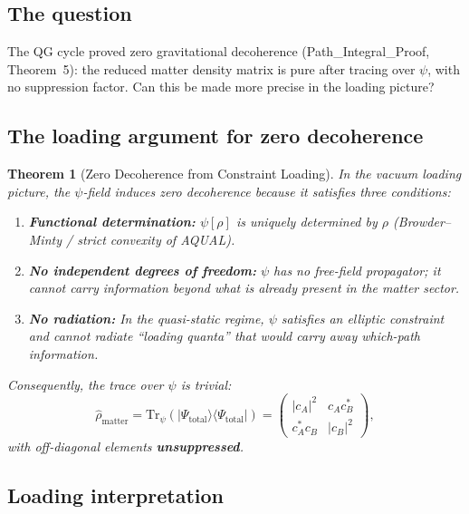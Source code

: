 \documentclass[11pt,a4paper]{article}
\newtheorem{theorem}{Theorem}[section]
\begin{document}
\subsection{The question}

The QG cycle proved zero gravitational decoherence
(Path\_Integral\_Proof, Theorem~5): the reduced matter density matrix is
pure after tracing over $\psi$, with no suppression factor.  Can this be
made more precise in the loading picture?

\subsection{The loading argument for zero decoherence}

\begin{theorem}[Zero Decoherence from Constraint Loading]
\label{thm:zero-decoherence-loading}
In the vacuum loading picture, the $\psi$-field induces zero decoherence
because it satisfies three conditions:
\begin{enumerate}
\item[(C1)] \textbf{Functional determination:} $\psi[\rho]$ is uniquely
determined by $\rho$ (Browder--Minty / strict convexity of AQUAL).
\item[(C2)] \textbf{No independent degrees of freedom:} $\psi$ has no
free-field propagator; it cannot carry information beyond what is already
present in the matter sector.
\item[(C3)] \textbf{No radiation:} In the quasi-static regime, $\psi$
satisfies an elliptic constraint and cannot radiate ``loading quanta''
that would carry away which-path information.
\end{enumerate}
Consequently, the trace over $\psi$ is trivial:
\begin{equation}
\hat{\rho}_{\mathrm{matter}}
= \mathrm{Tr}_\psi\!\left(|\Psi_{\mathrm{total}}\rangle
\langle\Psi_{\mathrm{total}}|\right)
= \begin{pmatrix}
|c_A|^2 & c_A c_B^* \\
c_A^* c_B & |c_B|^2
\end{pmatrix},
\end{equation}
with off-diagonal elements \textbf{unsuppressed}.
\end{theorem}

\subsection{Loading interpretation}
\end{document}
